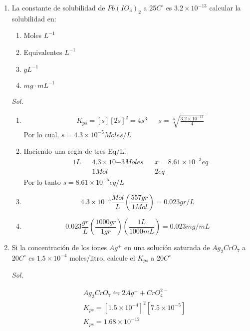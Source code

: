 \begin{enumerate}
	\item La constante de solubilidad de $Pb(IO_3)_2$ a 25$C^{\circ}$ es $3.2\times10^{-13}$ calcular la solubilidad en:

	      \begin{enumerate}
		      \item Moles $L^{-1}$
		      \item Equivalentes $L^{-1}$
		      \item $gL^{-1}$
		      \item $mg\cdot mL^{-1}$
	      \end{enumerate}

	      \textit{ Sol. }


	      \begin{enumerate}
		      \item \begin{align*}
			             & K_{ps}=[s][2s]^2=4s^3 &  & s=\sqrt[3]{\frac{3.2\times 10^{-13}}{4}}
		            \end{align*}
		            Por lo cual, $s=4.3\times10^{-5}Moles/L$
		      \item Haciendo una regla de tres Eq/L:
		            \begin{align*}
			             & 1L &  & 4.3\times10{-3}Moles &  & x=8.61\times10^{-3}eq \\
			             &    &  & 1Mol                 &  & 2eq
		            \end{align*}
		            Por lo tanto $s=8.61\times 10^{-5}eq/L$
		      \item \begin{equation*}
			            4.3\times10^{-5}\frac{Mol}{L}\left(\frac{557gr}{1Mol}\right)=0.023gr/L
		            \end{equation*}
		      \item \begin{equation*}
			            0.023\frac{gr}{L}\left(\frac{1000gr}{1gr}\right)\left(\frac{1L}{1000mL}\right)=0.023mg/mL
		            \end{equation*}
	      \end{enumerate}


	\item Si la concentración de los iones $Ag^+$ en una solución saturada de $Ag_2CrO_7$ a 20$C^{\circ}$ es $1.5\times10^{-4}$ moles/litro, calcule el $K_{ps}$ a 20$C^{\circ}$


	      \textit{ Sol. }

	      \begin{align*}
		       & Ag_2CrO_7\leftrightharpoons 2Ag^++CrO_4^{2-}  \\
		       & K_{ps}=[1.5\times10^{-4}]^2[7.5\times10^{-5}] \\
		       & K_{ps}=1.68\times10^{-12}
	      \end{align*}


\end{enumerate}
